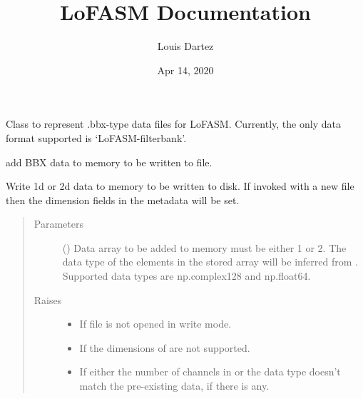 \documentclass[letterpaper,10pt,english]{sphinxmanual}
\title{LoFASM Documentation}
\date{Apr 14, 2020}
\author{Louis Dartez}
\begin{document}
\maketitle
\sphinxtableofcontents
{}\label{\detokenize{index::doc}}


\begin{fulllineitems}
\label{\detokenize{index:lofasm.bbx.bbx.LofasmFile}}
Class to represent .bbx-type data files for LoFASM.
Currently, the only data format supported is ‘LoFASM-filterbank’.

\begin{fulllineitems}
\label{\detokenize{index:lofasm.bbx.bbx.LofasmFile.add_data}}
add BBX data to memory to be written to file.

Write 1d or 2d data to memory to be written to disk.
If invoked with a new file then the dimension fields in the
metadata will be set.
\begin{quote}\begin{description}
\item[{Parameters}] \leavevmode
{} () \textendash{} Data array to be added to memory
 must be either 1 or 2.
The data type of the elements in the stored array will be inferred from .
Supported data types are np.complex128 and np.float64.

\item[{Raises}] \leavevmode\begin{itemize}
\item {} 
 \textendash{} If file is not opened in write mode.

\item {} 
 \textendash{} If the dimensions of  are not supported.

\item {} 
 \textendash{} If either the number of channels in  or the data type doesn’t match the pre-existing data, if there is
any.


\end{itemize}
\end{description}
\end{quote}
\end{fulllineitems}
\end{fulllineitems}
\end{document}
